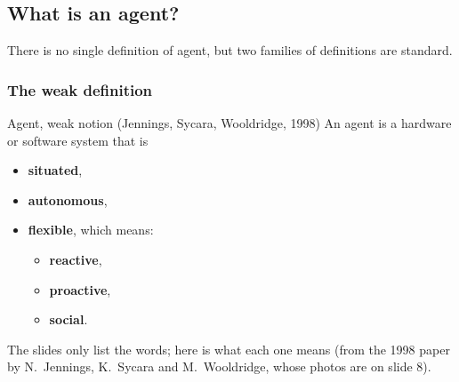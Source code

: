\subsection{What is an agent?}
\label{sec:what-is-an-agent}

There is no single definition of agent, but two families of definitions are standard.

\subsubsection{The weak definition}

\begin{nbdef}{Agent, weak notion (Jennings, Sycara, Wooldridge, 1998)}
An agent is a hardware or software system that is
\begin{itemize}[nosep]
  \item \textbf{situated},
  \item \textbf{autonomous},
  \item \textbf{flexible}, which means:
        \begin{itemize}[nosep]
          \item \textbf{reactive},
          \item \textbf{proactive},
          \item \textbf{social}.
        \end{itemize}
\end{itemize}
\end{nbdef}

The slides only list the words; here is what each one means (from the 1998 paper by
N.~Jennings, K.~Sycara and M.~Wooldridge, whose photos are on slide 8).

